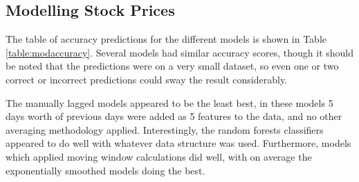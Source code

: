\subsection{Modelling Stock Prices}
The table of accuracy predictions for the different models is shown in Table \ref{table:modaccuracy}. Several models had similar accuracy scores, though it should be noted that the predictions were on a very small dataset, so even one or two correct or incorrect predictions could sway the result considerably. 

The manually lagged models appeared to be the least best, in these models 5 days worth of previous days were added as 5 features to the data, and no other averaging methodology applied. Interestingly, the random forests classifiers appeared to do well with whatever data structure was used. Furthermore, models which applied moving window calculations did well, with on average the exponentially smoothed models doing the best.

